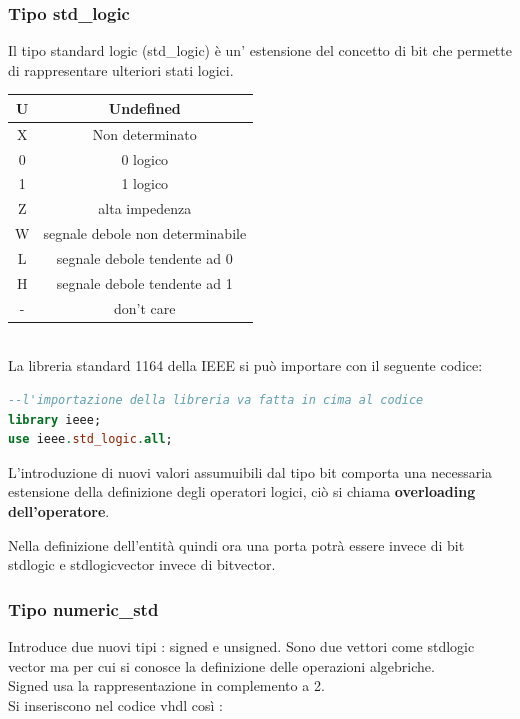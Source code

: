 \documentclass[a4paper]{book}
\begin{document}
\subsubsection{Tipo std\_logic}

Il tipo standard logic (std\_logic) è un' estensione del concetto di bit che permette di rappresentare ulteriori stati logici.\vspace{\baselineskip}\\
\begin{tabular}{|c|c|}
\hline
U & Undefined \\
\hline
X & Non determinato \\
\hline
0 & 0 logico \\
\hline
1 & 1 logico \\
\hline
Z & alta impedenza \\
\hline
W & segnale debole non determinabile \\
\hline
L & segnale debole tendente ad 0 \\
\hline
H & segnale debole tendente ad 1 \\
\hline
- & don't care \\
\hline
\end{tabular}
\vspace{\baselineskip}\\
La libreria standard 1164 della IEEE si può importare con il seguente codice:

\begin{lstlisting}[language= VHDL]
--l'importazione della libreria va fatta in cima al codice
library ieee;
use ieee.std_logic.all;

\end{lstlisting}

L'introduzione di nuovi valori assumuibili dal tipo bit comporta una necessaria estensione della definizione degli operatori logici, ciò si chiama \textbf{overloading dell'operatore}.


Nella definizione dell'entità quindi ora una porta potrà essere invece di bit std\textunderscore logic e std\textunderscore logic\textunderscore vector invece di bit\textunderscore vector.

\subsubsection{Tipo numeric\_std}

Introduce due nuovi tipi : signed e unsigned.
Sono due vettori come std\textunderscore logic \textunderscore vector ma per cui si conosce la definizione delle operazioni algebriche.\\
Signed usa la rappresentazione in complemento a 2.\\
Si inseriscono nel codice vhdl così :\\
\end{document}
